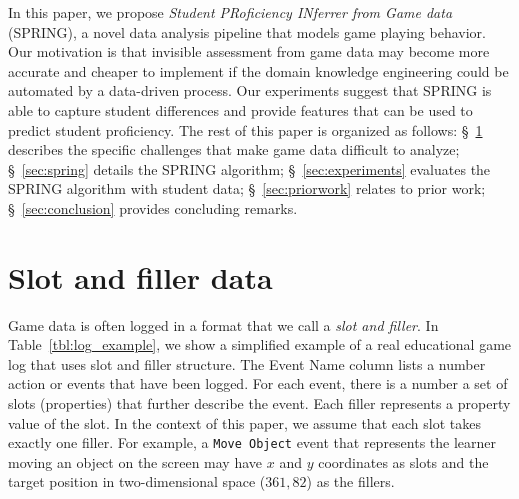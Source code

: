 \documentclass{sigchi}
\def\algname{SPRING\xspace}
\begin{document}
	
	In this paper, we propose \textit{Student PRoficiency INferrer from Game data} (SPRING), a novel data analysis pipeline that models game playing behavior.
	Our motivation is that invisible assessment from game data may become more accurate and cheaper to implement if the domain knowledge engineering could be automated by a data-driven process.
	Our experiments suggest that \algname is able to capture student differences and provide features that can be used to predict student proficiency.
	The rest of this paper is organized as follows:
	\S~\ref{sec:game_data} describes the specific challenges that make game data difficult to analyze;
	\S~\ref{sec:spring} details the SPRING algorithm;
	\S~\ref{sec:experiments} evaluates the SPRING algorithm with student data;
	\S~\ref{sec:priorwork} relates to prior work;
	\S~\ref{sec:conclusion} provides concluding remarks.
	
	
	\section{Slot and filler data}
	\label{sec:game_data}
	Game data is often logged  in a format that we call a \textit{slot and filler}.
	In Table~\ref{tbl:log_example}, we show a simplified example of a real educational game log that uses slot and filler structure.
	The Event Name column lists a number action or events that have been logged.
	For each event, there is a number a set of slots (properties) that further describe the event.
	Each filler represents a property value of the slot.
	In the context of this paper, we assume that each slot takes exactly one filler.
	For example, a \texttt{Move Object} event  that represents the learner moving an object on the screen may have $x$ and $y$ coordinates as slots and the target position in two-dimensional space ($361, 82$) as the fillers.
	\newline
	
\end{document}
